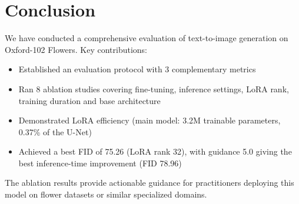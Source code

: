 \documentclass[11pt]{article}
\begin{document}
\section{Conclusion}

We have conducted a comprehensive evaluation of text-to-image generation on Oxford-102 Flowers. Key contributions:

\begin{itemize}
    \item Established an evaluation protocol with 3 complementary metrics
    \item Ran 8 ablation studies covering fine-tuning, inference settings, LoRA rank, training duration and base architecture
    \item Demonstrated LoRA efficiency (main model: 3.2M trainable parameters, 0.37\% of the U-Net)
    \item Achieved a best FID of 75.26 (LoRA rank 32), with guidance 5.0 giving the best inference-time improvement (FID 78.96)
\end{itemize}

The ablation results provide actionable guidance for practitioners deploying this model on flower datasets or similar specialized domains.
\end{document}
